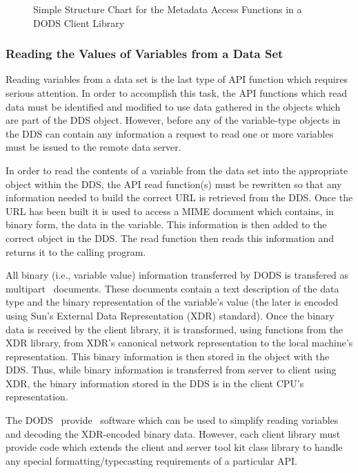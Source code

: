 \begin{figure}
\centerline{}
\caption{Simple Structure Chart for the Metadata Access Functions in a DODS
  Client Library}
\label{fig:client-metaread}
\end{figure}

\subsubsection{Reading the Values of Variables from a Data Set}

Reading variables from a data set is the last type of API function which
requires serious attention. In order to accomplish this task, the API
functions which read data must be identified and modified to use data
gathered in the objects which are part of the DDS object. However, before any
of the variable-type objects in the DDS can contain any information a request
to read one or more variables must be issued to the remote data server.

In order to read the contents of a variable from the data set into the
appropriate object within the DDS, the API read function(s) must be rewritten
so that any information needed to build the correct URL is retrieved from the
DDS\@. Once the URL has been built it is used to access a MIME document which
contains, in binary form, the data in the variable. This information is then
added to the correct object in the DDS\@. The read function then reads this
information and returns it to the calling program.

All binary (i.e., variable value) information transferred by DODS is
transfered as multipart \MIME\ documents. These documents contain a text
description of the data type and the binary representation of the variable's
value (the later is encoded using Sun's External Data Representation (XDR)
standard). Once the binary data is received by the client library, it is
transformed, using functions from the XDR library, from XDR's canonical
network representation to the local machine's representation. This binary
information is then stored in the object with the DDS\@. Thus, while binary
information is transferred from server to client using XDR, the binary
information stored in the DDS is in the client CPU's representation.

The DODS \toolkit\ provide \Cpp\ software which can be used to simplify
reading variables and decoding the XDR-encoded binary data. However, each
client library must provide code which extends the client and server tool kit
class library to handle any special formatting/typecasting requirements of a
particular API\@.

